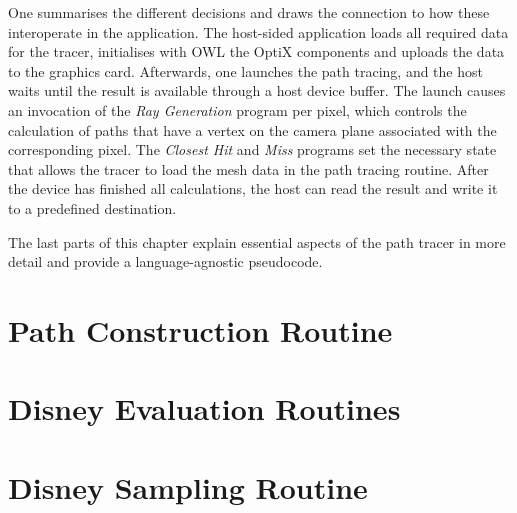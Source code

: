 One summarises the different decisions and draws the connection to how these interoperate in the application.
The host-sided application loads all required data for the tracer, initialises with OWL the OptiX components and uploads the data to the graphics card.
Afterwards, one launches the path tracing, and the host waits until the result is available through a host device buffer.
The launch causes an invocation of the \textit{Ray Generation} program per pixel, which controls the calculation of paths that have a vertex on the camera plane associated with the corresponding pixel.
The \textit{Closest Hit} and \textit{Miss} programs set the necessary state that allows the tracer to load the mesh data in the path tracing routine.
After the device has finished all calculations, the host can read the result and write it to a predefined destination. 

The last parts of this chapter explain essential aspects of the path tracer in more detail and provide a language-agnostic pseudocode.
\section{Path Construction Routine}

\section{Disney Evaluation Routines}

\section{Disney Sampling Routine}
